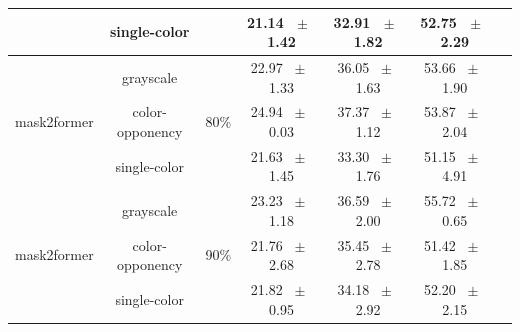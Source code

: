 \begin{table}[h]
\begin{tabular}{@{}lccc ccc@{}}
    & single-color & & 21.14 ~$\pm$~ 1.42 & 32.91 ~$\pm$~ 1.82 & 52.75 ~$\pm$~ 2.29 \\
    \midrule
    \multirow{3}{*}{mask2former} & grayscale & \multirow{3}{*}{80\%} & 22.97 ~$\pm$~ 1.33 & 36.05 ~$\pm$~ 1.63 & 53.66 ~$\pm$~ 1.90 \\
    & color-opponency & & 24.94 ~$\pm$~ 0.03 & 37.37 ~$\pm$~ 1.12 & 53.87 ~$\pm$~ 2.04 \\
    & single-color & & 21.63 ~$\pm$~ 1.45 & 33.30 ~$\pm$~ 1.76 & 51.15 ~$\pm$~ 4.91 \\
    \midrule
    \multirow{3}{*}{mask2former} & grayscale & \multirow{3}{*}{90\%} & 23.23 ~$\pm$~ 1.18 & 36.59 ~$\pm$~ 2.00 & 55.72 ~$\pm$~ 0.65 \\
    & color-opponency & & 21.76 ~$\pm$~ 2.68 & 35.45 ~$\pm$~ 2.78 & 51.42 ~$\pm$~ 1.85 \\
    & single-color & & 21.82 ~$\pm$~ 0.95 & 34.18 ~$\pm$~ 2.92 & 52.20 ~$\pm$~ 2.15 \\
    \midrule
    \bottomrule
  \end{tabular}
  \label{tab:sparse_mask2former_acdc_night}
\end{table}